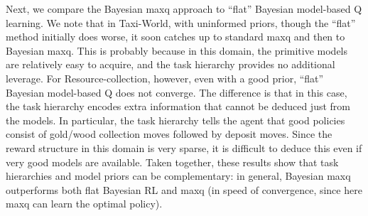 Next, we compare the Bayesian {\sc maxq} approach to ``flat'' Bayesian
model-based Q learning. We note that in {\sf Taxi-World}, with uninformed
priors, though the ``flat'' method initially does worse, it soon
catches up to standard {\sc maxq} and then to Bayesian {\sc maxq}. This is
probably because in this domain, the primitive models are relatively
easy to acquire, and the task hierarchy provides no additional
leverage. For {\sf Resource-collection}, however, 
even with a good prior, ``flat'' Bayesian model-based Q does not
converge. The difference is that in this case, the task hierarchy
encodes extra information that cannot be deduced just from the models.
In particular, the task hierarchy tells the agent that good policies
consist of gold/wood collection moves followed by deposit moves. Since
the reward structure in this domain is very sparse, it is difficult to
deduce this even if very good models are available. Taken together,
these results show that task hierarchies and model priors can be
complementary: in general, Bayesian {\sc maxq} outperforms both flat
Bayesian RL and {\sc maxq} (in speed of convergence, since here {\sc maxq} can
learn the optimal policy).


